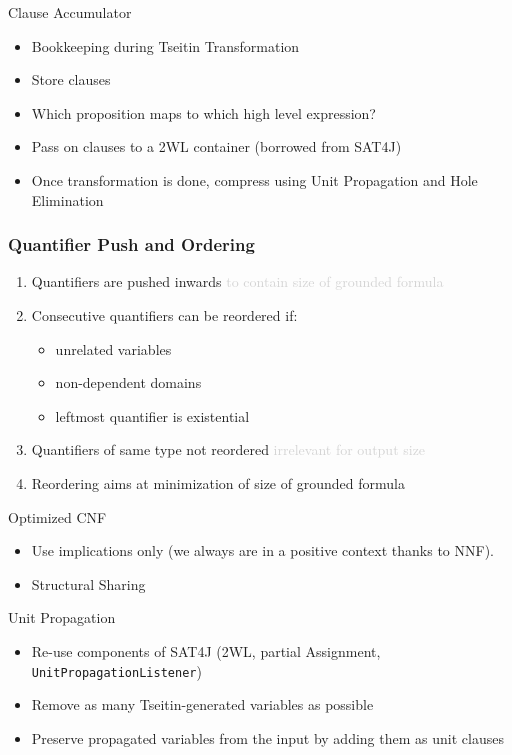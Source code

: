 \documentclass[smaller,dvipsnames]{beamer}
\begin{document}
  \begin{frame}{Clause Accumulator}
    \begin{itemize}
      \item Bookkeeping during Tseitin Transformation
      \item Store clauses
      \item Which proposition maps to which high level expression?
      \item Pass on clauses to a 2WL container (borrowed from SAT4J)
      \item Once transformation is done, compress using Unit Propagation and Hole Elimination
    \end{itemize}
  \end{frame}
  
  \begin{frame}
    \frametitle{Quantifier Push and Ordering}
    \begin{enumerate}
      \item Quantifiers are pushed \alert{inwards} \textcolor{lightgray}{to contain size of grounded formula}
      \item Consecutive quantifiers can be reordered if:
      \begin{itemize}
        \item unrelated variables
        \item \alert{non-dependent} domains 
        \item leftmost quantifier is existential
      \end{itemize}
      \item Quantifiers of same type not reordered \textcolor{lightgray}{irrelevant for output size}
      \item Reordering aims at \alert{minimization} of size of grounded formula
    \end{enumerate}
  \end{frame}

  \begin{frame}{Optimized CNF}
    \begin{itemize}
      \item Use implications only (we always are in a positive context thanks to NNF).
  		\item Structural Sharing
  	\end{itemize}
  \end{frame}

  \begin{frame}{Unit Propagation}
    \begin{itemize}
      \item Re-use components of SAT4J (2WL, partial Assignment, \texttt{UnitPropagationListener})
      \item Remove as many Tseitin-generated variables as possible
      \item Preserve propagated variables from the input by adding them as unit clauses
    \end{itemize}
  \end{frame}
\end{document}
